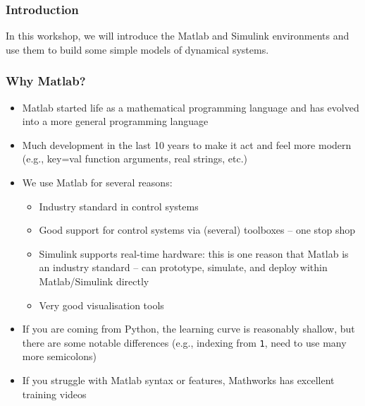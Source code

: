 \documentclass[9pt]{beamer-control}
\begin{document}

\begin{frame}
\frametitle{Introduction}
In this workshop, we will introduce the Matlab and Simulink environments and use them to build some simple models of dynamical systems.
\end{frame}


\begin{frame}
\frametitle{Why Matlab?}
\begin{itemize}
\item Matlab started life as a mathematical programming language and has evolved into a more general programming language
\item Much development in the last 10 years to make it act and feel more modern (e.g., key=val function arguments, real strings, etc.)
\item We use Matlab for several reasons:
\begin{itemize}
\item  Industry standard in control systems
\item  Good support for control systems via (several) toolboxes -- one stop shop
\item  Simulink supports real-time hardware: this is one reason that Matlab is an industry standard -- can prototype, simulate, and deploy within Matlab/Simulink directly
\item  Very good visualisation tools
\end{itemize}
\item If you are coming from Python, the learning curve is reasonably shallow, but there are some notable differences (e.g., indexing from \texttt{1}, need to use many more semicolons)
\item If you struggle with Matlab syntax or features, Mathworks has excellent training videos
\end{itemize}
\end{frame}
\end{document}
